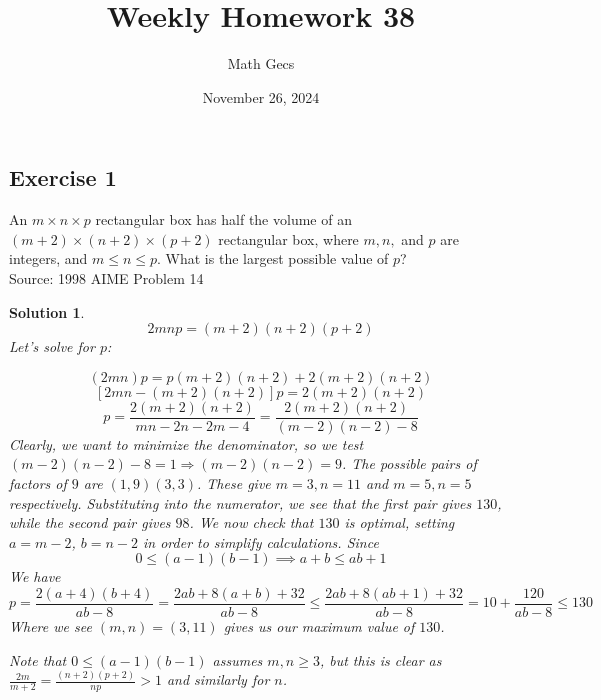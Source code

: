\documentclass[12pt]{article}
\title{Weekly Homework 38}
\author{Math Gecs}
\date{November 26, 2024}
\newtheorem*{solution*}{Solution}
\begin{document}
\maketitle

\subsection*{Exercise 1}
An $m\times n\times p$ rectangular box has half the volume of an $(m + 2)\times(n + 2)\times(p + 2)$ rectangular box, where $m, n,$ and $p$ are integers, and $m\le n\le p.$ What is the largest possible value of $p$?\\

Source: 1998 AIME Problem 14\\


\begin{solution*}
\[2mnp = (m+2)(n+2)(p+2)\]
Let’s solve for $p$:

\[(2mn)p = p(m+2)(n+2) + 2(m+2)(n+2)\]\[[2mn - (m+2)(n+2)]p = 2(m+2)(n+2)\]\[p = \frac{2(m+2)(n+2)}{mn - 2n - 2m - 4} = \frac{2(m+2)(n+2)}{(m-2)(n-2) - 8}\]
Clearly, we want to minimize the denominator, so we test $(m-2)(n-2) - 8 = 1 \Longrightarrow (m-2)(n-2) = 9$. The possible pairs of factors of $9$ are $(1,9)(3,3)$. These give $m = 3, n = 11$ and $m = 5, n = 5$ respectively. Substituting into the numerator, we see that the first pair gives $130$, while the second pair gives $98$. We now check that $130$ is optimal, setting $a=m-2$, $b=n-2$ in order to simplify calculations. Since\[0 \le (a-1)(b-1) \implies a+b \le ab+1\]We have\[p = \frac{2(a+4)(b+4)}{ab-8} = \frac{2ab+8(a+b)+32}{ab-8} \le \frac{2ab+8(ab+1)+32}{ab-8} = 10 + \frac{120}{ab-8} \le 130\]Where we see $(m,n)=(3,11)$ gives us our maximum value of $\boxed{130}$.

Note that $0 \le (a-1)(b-1)$ assumes $m,n \ge 3$, but this is clear as $\frac{2m}{m+2} = \frac{(n+2)(p+2)}{np} > 1$ and similarly for $n$.
\end{solution*}
\end{document}
